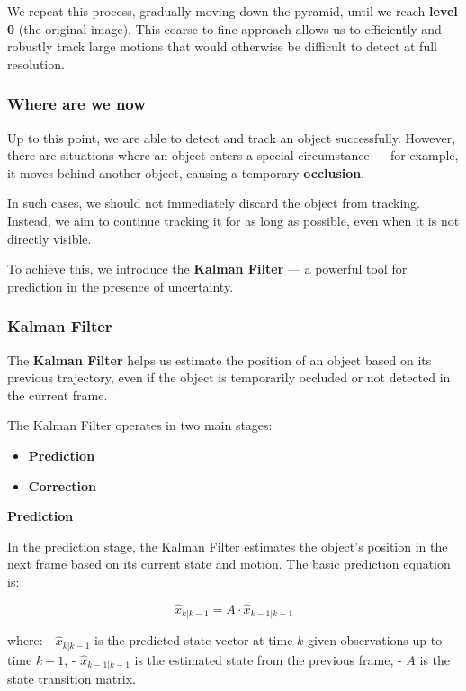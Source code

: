 \documentclass[a4paper,12pt]{article}
\begin{document}
We repeat this process, gradually moving down the pyramid, until we reach \textbf{level 0} (the original image).  
This coarse-to-fine approach allows us to efficiently and robustly track large motions that would otherwise be difficult to detect at full resolution.

\subsubsection{Where are we now}

Up to this point, we are able to detect and track an object successfully.  
However, there are situations where an object enters a special circumstance — for example, it moves behind another object, causing a temporary \textbf{occlusion}.

In such cases, we should not immediately discard the object from tracking. Instead, we aim to continue tracking it for as long as possible, even when it is not directly visible.

To achieve this, we introduce the \textbf{Kalman Filter} — a powerful tool for prediction in the presence of uncertainty.  

\subsubsection{Kalman Filter}

The \textbf{Kalman Filter} helps us estimate the position of an object based on its previous trajectory, even if the object is temporarily occluded or not detected in the current frame.

The Kalman Filter operates in two main stages:

\begin{itemize}
    \item \textbf{Prediction}
    \item \textbf{Correction}
\end{itemize}

\textbf{Prediction} 

In the prediction stage, the Kalman Filter estimates the object's position in the next frame based on its current state and motion. The basic prediction equation is:

\[
\hat{x}_{k|k-1} = A \cdot \hat{x}_{k-1|k-1}
\]

where:
- \( \hat{x}_{k|k-1} \) is the predicted state vector at time \( k \) given observations up to time \( k-1 \),
- \( \hat{x}_{k-1|k-1} \) is the estimated state from the previous frame,
- \( A \) is the state transition matrix.
\end{document}
